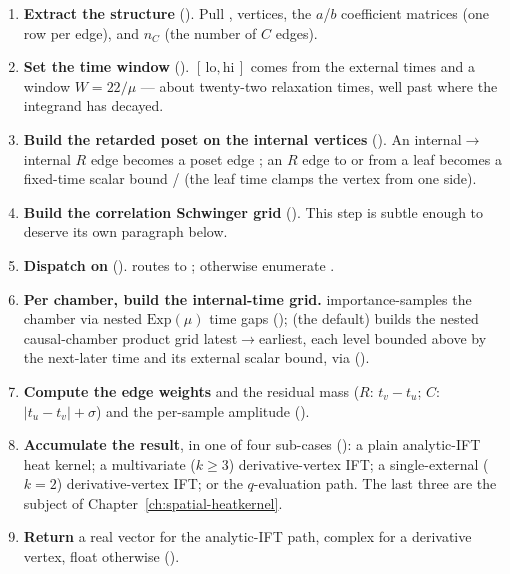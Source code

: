 \begin{enumerate}
  \item \textbf{Extract the structure} (). Pull
        ,  vertices, the $a$/$b$ coefficient matrices
        (one row per edge), and $n_C$ (the number of $C$ edges).
  \item \textbf{Set the time window} ().
        $[\,\text{lo},\text{hi}\,]$ comes from the external times and a window
        $W=22/\mu$ --- about twenty-two relaxation times, well past where the
        integrand has decayed.
  \item \textbf{Build the retarded poset on the internal vertices}
        (). An internal$\to$internal $R$ edge
        becomes a poset edge ; an $R$ edge to or from a leaf
        becomes a fixed-time scalar bound / (the leaf time
        clamps the vertex from one side).
  \item \textbf{Build the correlation Schwinger grid}
        (). This step is subtle enough to
        deserve its own paragraph below.
  \item \textbf{Dispatch on } ().
         routes to ; otherwise
        enumerate .
  \item \textbf{Per chamber, build the internal-time grid.} 
        importance-samples the chamber via nested $\mathrm{Exp}(\mu)$ time gaps
        ();  (the default) builds
        the nested causal-chamber product grid latest$\to$earliest, each level
        bounded above by the next-later time and its external scalar bound, via
         ().
  \item \textbf{Compute the edge weights}  and the residual mass
         ($R$: $t_v-t_u$; $C$: $|t_u-t_v|+\sigma$) and the
        per-sample amplitude  ().
  \item \textbf{Accumulate the result}, in one of four sub-cases
        (): a plain analytic-IFT heat kernel; a
        multivariate ($k\ge3$) derivative-vertex IFT; a single-external
        ($k=2$) derivative-vertex IFT; or the $q$-evaluation path. The last three
        are the subject of Chapter~\ref{ch:spatial-heatkernel}.
  \item \textbf{Return} a real vector for the analytic-IFT path, complex for a
        derivative vertex, float otherwise
        ().
\end{enumerate}

